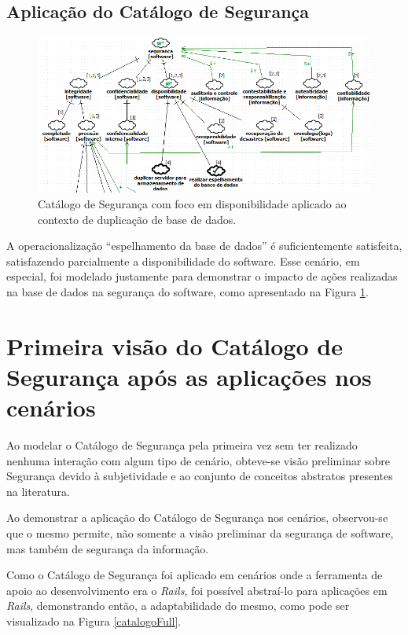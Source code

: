 \pagebreak

\subsection{Aplicação do Catálogo de Segurança}

\begin{figure}[h!]
	\centering
	\includegraphics[keepaspectratio=true,scale=0.8]{figuras/catalogoPersona5.PNG}
	\caption{Catálogo de Segurança com foco em disponibilidade aplicado ao contexto de duplicação de base de dados.}
	\label{catalogoPersona5}
\end{figure}

A operacionalização “espelhamento da base de dados” é suficientemente satisfeita, satisfazendo parcialmente a disponibilidade do software. Esse cenário, em especial, foi modelado justamente para demonstrar o impacto de ações realizadas na base de dados na segurança do software, como apresentado na Figura \ref{catalogoPersona5}.


\section{Primeira visão do Catálogo de Segurança após as aplicações nos cenários}
\label{sec:aplicacaoDoCatalogo}

Ao modelar o Catálogo de Segurança pela primeira vez sem ter realizado nenhuma interação com algum tipo de cenário, obteve-se visão preliminar sobre Segurança devido à subjetividade e ao conjunto de conceitos abstratos presentes na literatura.  

Ao demonstrar a aplicação do Catálogo de Segurança nos cenários, observou-se que o mesmo permite, não somente a visão preliminar da segurança de software, mas também de segurança da informação.

Como o Catálogo de Segurança foi aplicado em cenários onde a ferramenta de apoio ao desenvolvimento era o \textit{Rails}, foi possível abstraí-lo para aplicações em \textit{Rails}, demonstrando então, a adaptabilidade do mesmo, como pode ser visualizado na Figura \ref{catalogoFull}.

